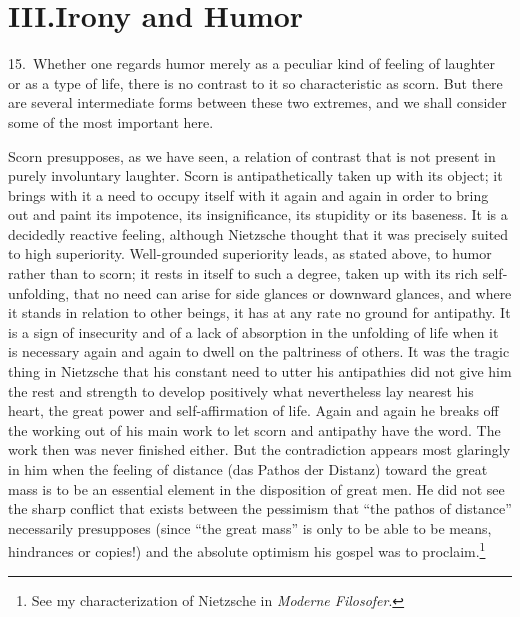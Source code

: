 \documentclass[12pt]{book}
\newcommand{\opage}[1]{\marginnote{\footnotesize\textit{[#1]}}}
\begin{document}
\chapter*{III.\quad Irony and Humor}
\opage{59}15.~Whether one regards humor merely as a peculiar kind of feeling of
laughter or as a type of life, there is no contrast to it so characteristic as
scorn. But there are several intermediate forms between these two extremes, and we
shall consider some of the most important here.

Scorn presupposes, as we have seen, a relation of contrast that is not present in
purely involuntary laughter. Scorn is antipathetically taken up with its object; it
brings with it a need to occupy itself with it again and again in order to bring out
and paint its impotence, its insignificance, its stupidity or its baseness. It is a
decidedly reactive feeling, although Nietzsche thought that it was precisely suited
to high superiority. Well-grounded superiority leads, as stated above, to humor
rather than to scorn; it rests in itself to such a degree, taken up with its rich
self-unfolding, that no need can arise for side glances or downward glances, and
where it stands in relation to other beings, it has at any rate no ground for
antipathy. It is a sign of insecurity and of a lack of absorption in the unfolding
of life when it is necessary again and again to dwell on the paltriness of others.
It was the tragic thing in Nietzsche that his constant need to utter his antipathies
did not give him the rest and strength to develop positively what nevertheless lay
nearest his heart, the great power and self-affirmation of life. Again and again he
breaks off the working out of his main work to let scorn and antipathy have the
word. The work then was never finished either. But the contradiction appears most
glaringly in him when the feeling of distance (das Pathos der Distanz) toward the
great mass is to be an essential element in the disposition of great men. He did not
see the sharp conflict that \opage{60}exists between the pessimism that ``the pathos
of distance'' necessarily presupposes (since ``the great mass'' is only to be able to
be means, hindrances or copies!) and the absolute optimism his gospel was to
proclaim.\footnote{See my characterization of Nietzsche in \textit{Moderne
Filosofer}.}
\end{document}
